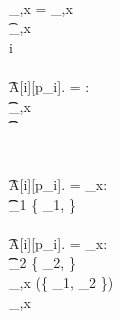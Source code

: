 {\begin{center}
{{\begin{pcvstack}[boxed,space=0.5em]
\begin{pchstack}
\begin{pcvstack}
{						\\
						\pcif \cnt_{,x} =  \cnt_{,x}\label{line:UB=LB:start}\\
						\t \pcreturn \cnt_{,x} \label{line:UB=LB:finish}\\
						\pcfor i \in [k] \label{line:ck:startoverestdjust}\\
						\\
						\t \pcif A[i][p_i]. = \star:\\
						\t \t \cnt_{,x} \\
						\t \t {} \label{line:ck:est0}\\
						\\
						\\
						\t \pcelse \pcif A[i][p_i]. \not= \fp_x:\\
						\t \t \Theta_1 \gets 
						\min\left\{ 
						\Theta_1, 
						\right\}\\
						\\
						\t \pcelse \pcif A[i][p_i]. = \fp_x:\\
                                                \t \t \Theta_2 \gets 
						\min\left\{ 
						\Theta_2, 
						\right\}\\
						\cnt_{,x} \gets \floor(\min\left\{ \Theta_1, \Theta_2 \right\}) \label{line:ck:finaloverest}\\
						\pcreturn \cnt_{,x}
					}
					\vspace{1cm}
				\end{pcvstack}
			\end{pchstack}	
		\end{pcvstack}
}}
\end{center}}
